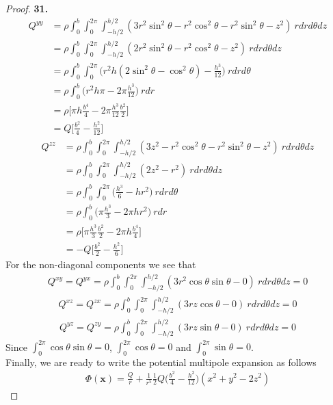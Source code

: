 \documentclass[11pt]{article}
\theoremstyle{definition}
\begin{document}
\begin{proof}{\textbf{31.}}
\begin{align*}
    Q^{yy} &= \rho \int_0^b\int_0^{2\pi}\int_{-h/2}^{h/2}
    (3r^2\sin^2\theta - r^2\cos^2\theta - r^2\sin^2\theta - z^2)~rdrd\theta dz\\
    &= \rho \int_0^b\int_0^{2\pi}\int_{-h/2}^{h/2}
    (2r^2\sin^2\theta - r^2\cos^2\theta - z^2)~rdrd\theta dz\\
    &= \rho \int_0^b\int_0^{2\pi}
    \bigg(r^2h(2\sin^2\theta - \cos^2\theta) - \frac{h^3}{12}\bigg)~rdrd\theta\\
    &= \rho \int_0^b
    \bigg(r^2h\pi - 2\pi\frac{h^3}{12}\bigg)~rdr\\
    &= \rho\bigg[\pi h\frac{b^4}{4} - 2\pi\frac{h^3}{12}\frac{b^2}{2}\bigg]\\
    &= Q\bigg[\frac{b^2}{4} - \frac{h^2}{12}\bigg]
\end{align*}
\begin{align*}
    Q^{zz} &= \rho \int_0^b\int_0^{2\pi}\int_{-h/2}^{h/2}
    (3z^2 - r^2\cos^2\theta - r^2\sin^2\theta - z^2)~rdrd\theta dz\\
    &= \rho \int_0^b\int_0^{2\pi}\int_{-h/2}^{h/2} (2z^2 - r^2)~rdrd\theta dz\\
    &= \rho \int_0^b\int_0^{2\pi} \bigg(\frac{h^3}{6} - hr^2\bigg)~rdrd\theta\\
    &= \rho \int_0^b \bigg(\pi\frac{h^3}{3} - 2\pi hr^2\bigg)~rdr\\
    &= \rho \bigg[\pi\frac{h^3}{3}\frac{b^2}{2} - 2\pi h\frac{b^4}{4}\bigg]\\
    &= -Q \bigg[\frac{b^2}{2} - \frac{h^2}{6}\bigg]
\end{align*}
For the non-diagonal components we see that
\begin{align*}
    Q^{xy}  = Q^{yx} = \rho \int_0^b\int_0^{2\pi}\int_{-h/2}^{h/2}
    (3r^2\cos\theta\sin\theta - 0)~rdrd\theta dz = 0
\end{align*}
\begin{align*}
    Q^{xz} = Q^{zx} = \rho \int_0^b\int_0^{2\pi}\int_{-h/2}^{h/2}
    (3rz\cos\theta - 0)~rdrd\theta dz = 0
\end{align*}
\begin{align*}
    Q^{yz} = Q^{zy} = \rho \int_0^b\int_0^{2\pi}\int_{-h/2}^{h/2}
    (3rz\sin\theta - 0)~rdrd\theta dz = 0
\end{align*}
Since $\int_0^{2\pi} \cos\theta\sin\theta = 0$, $\int_0^{2\pi} \cos\theta = 0$
and $\int_0^{2\pi} \sin\theta = 0$.
\\
Finally, we are ready to write the potential multipole expansion as follows
\begin{align*}
    \Phi(\bm{x}) = \frac{Q}{r}
    + \frac{1}{r^5}\frac{1}{2}Q \bigg(\frac{b^2}{4} - \frac{h^2}{12}\bigg)
    (x^2 + y^2 - 2z^2)
\end{align*}


\end{proof}
\end{document}
